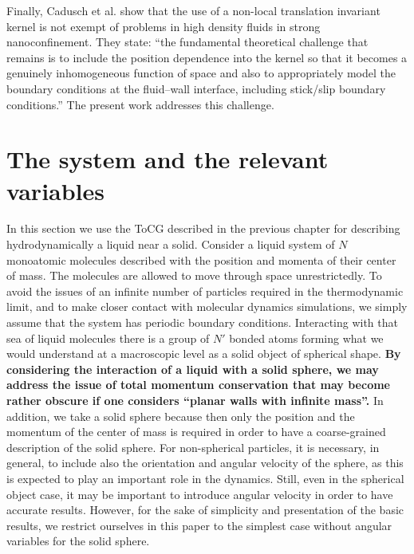 \documentclass[b5paper,openright,11pt]{book}
\newcommand{\Note}[1]{{\bf \color{red}#1}}    %
\begin{document}
Finally, Cadusch et al.  \cite{Cadusch2008}  show   that  the  use  of  a
non-local translation invariant kernel is not exempt  of problems in high
density fluids in strong nanoconfinement. They state: ``the fundamental
theoretical  challenge  that  remains   is  to  include  the  position
dependence  into   the  kernel   so  that   it  becomes   a  genuinely
inhomogeneous function  of space and  also to appropriately  model the
boundary conditions at the  fluid–wall interface, including stick/slip
boundary conditions.'' The present work addresses this challenge.


\section{The system and the relevant variables}
In this section we use the ToCG described in the previous chapter for describing hydrodynamically a liquid near a solid. 
Consider a liquid system of $N$ monoatomic molecules described
with the position and momenta of  their center of mass.  The molecules
are allowed to move through  space unrestrictedly. To avoid the issues
of  an infinite  number  of particles  required  in the  thermodynamic
limit, and to make closer contact with molecular dynamics simulations,
we simply  assume that  the system  has periodic  boundary conditions.
Interacting with that sea of liquid molecules there is a group of $N'$
bonded atoms forming  what we would understand at a macroscopic level
as a solid object of spherical shape. \Note{By considering the interaction of a liquid with a solid sphere, we may address the issue of total momentum conservation that may become rather obscure if one considers ``planar walls with infinite mass''.}
In addition, we take a solid sphere because then only the position and the momentum of the center of mass is required in order to have a coarse-grained description of the solid sphere. For non-spherical particles, it is necessary, in general, to include also the orientation  and angular velocity of the sphere, as this is expected to play an important role in the dynamics. 
Still, even in the spherical object case, it may be important to introduce angular velocity in order to have accurate results. 
However, for the sake of simplicity and presentation of the basic results, we restrict ourselves in this paper to the simplest case without angular variables for the solid sphere.  
\end{document}
